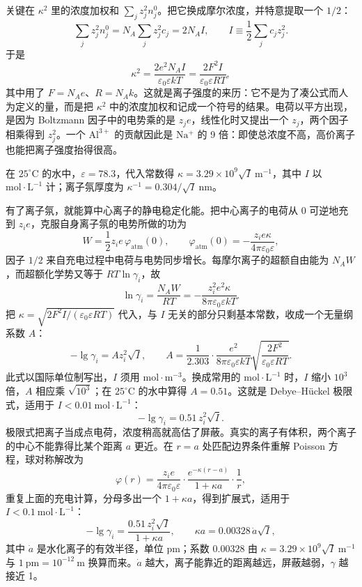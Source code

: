 \documentclass[UTF8]{ctexbook}
\begin{document}
关键在 \(\kappa^2\) 里的浓度加权和 \(\sum_j z_j^2 n_j^0\)。把它换成摩尔浓度，并特意提取一个 \(1/2\)：
\[
\sum_j z_j^2 n_j^0=N_A\sum_j z_j^2 c_j=2N_A I,
\qquad
I\equiv\frac{1}{2}\sum_j c_j z_j^2 .
\]
于是
\[
\kappa^2=\frac{2e^2N_A I}{\varepsilon_0\varepsilon kT}
=\frac{2F^2I}{\varepsilon_0\varepsilon RT},
\]
其中用了 \(F=N_Ae\)、\(R=N_Ak\)。这就是离子强度的来历：它不是为了凑公式而人为定义的量，而是把 \(\kappa^2\) 中的浓度加权和记成一个符号的结果。电荷以平方出现，是因为 Boltzmann 因子中的电势乘的是 \(z_j e\)，线性化时又提出一个 \(z_j\)，两个因子相乘得到 \(z_j^2\)。一个 \(\mathrm{Al^{3+}}\) 的贡献因此是 \(\mathrm{Na^+}\) 的 9 倍：即使总浓度不高，高价离子也能把离子强度抬得很高。

在 \(25^\circ\mathrm{C}\) 的水中，\(\varepsilon=78.3\)，代入常数得 \(\kappa=3.29\times10^{9}\sqrt{I}\ \mathrm{m^{-1}}\)，其中 \(I\) 以 \(\mathrm{mol\cdot L^{-1}}\) 计；离子氛厚度为 \(\kappa^{-1}=0.304/\sqrt{I}\ \mathrm{nm}\)。

有了离子氛，就能算中心离子的静电稳定化能。把中心离子的电荷从 0 可逆地充到 \(z_i e\)，克服自身离子氛的电势所做的功为
\[
W=\frac{1}{2}z_i e\,\varphi_{\mathrm{atm}}(0),
\qquad
\varphi_{\mathrm{atm}}(0)=-\frac{z_i e\kappa}{4\pi\varepsilon_0\varepsilon},
\]
因子 \(1/2\) 来自充电过程中电荷与电势同步增长。每摩尔离子的超额自由能为 \(N_A W\)，而超额化学势又等于 \(RT\ln\gamma_i\)，故
\[
\ln\gamma_i=\frac{N_A W}{RT}
=-\frac{z_i^2e^2\kappa}{8\pi\varepsilon_0\varepsilon kT}.
\]
把 \(\kappa=\sqrt{2F^2I/(\varepsilon_0\varepsilon RT)}\) 代入，与 \(I\) 无关的部分只剩基本常数，收成一个无量纲系数 \(A\)：
\[
-\lg\gamma_i=A z_i^2\sqrt{I},
\qquad
A=\frac{1}{2.303}\cdot\frac{e^2}{8\pi\varepsilon_0\varepsilon kT}
\sqrt{\frac{2F^2}{\varepsilon_0\varepsilon RT}} .
\]
此式以国际单位制写出，\(I\) 须用 \(\mathrm{mol\cdot m^{-3}}\)。换成常用的 \(\mathrm{mol\cdot L^{-1}}\) 时，\(I\) 缩小 \(10^3\) 倍，\(A\) 相应乘 \(\sqrt{10^3}\)；在 \(25^\circ\mathrm{C}\) 的水中算得 \(A=0.51\)。这就是 Debye--H\"uckel 极限式，适用于 \(I<0.01\ \mathrm{mol\cdot L^{-1}}\)：
\[
-\lg\gamma_i=0.51\,z_i^2\sqrt{I}.
\]
极限式把离子当成点电荷，浓度稍高就高估了屏蔽。真实的离子有体积，两个离子的中心不能靠得比某个距离 \(a\) 更近。在 \(r=a\) 处匹配边界条件重解 Poisson 方程，球对称解改为
\[
\varphi(r)=\frac{z_i e}{4\pi\varepsilon_0\varepsilon}\cdot
\frac{e^{-\kappa(r-a)}}{1+\kappa a}\cdot\frac{1}{r},
\]
重复上面的充电计算，分母多出一个 \(1+\kappa a\)，得到扩展式，适用于 \(I<0.1\ \mathrm{mol\cdot L^{-1}}\)：
\[
-\lg\gamma_i=\frac{0.51\,z_i^2\sqrt{I}}{1+\kappa a},
\qquad
\kappa a=0.00328\,\dot{a}\sqrt{I},
\]
其中 \(\dot{a}\) 是水化离子的有效半径，单位 pm；系数 \(0.00328\) 由 \(\kappa=3.29\times10^{9}\sqrt{I}\ \mathrm{m^{-1}}\) 与 \(1\ \mathrm{pm}=10^{-12}\ \mathrm{m}\) 换算而来。\(\dot{a}\) 越大，离子能靠近的距离越远，屏蔽越弱，\(\gamma\) 越接近 1。
\end{document}
